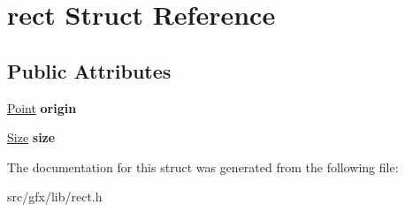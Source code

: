 \hypertarget{structrect}{}\section{rect Struct Reference}
\label{structrect}
\subsection*{Public Attributes}
\begin{DoxyCompactItemize}
\item 
\mbox{\label{structrect_a4cceb76c3facd05d499f359e27bcc7fd}} 
\hyperlink{structcoordinate}{Point} {\bfseries origin}
\item 
\mbox{\label{structrect_a9a58d00345dd47ee16a4e4947edc4a14}} 
\hyperlink{structsize}{Size} {\bfseries size}
\end{DoxyCompactItemize}


The documentation for this struct was generated from the following file\+:\begin{DoxyCompactItemize}
\item 
src/gfx/lib/rect.\+h\end{DoxyCompactItemize}
